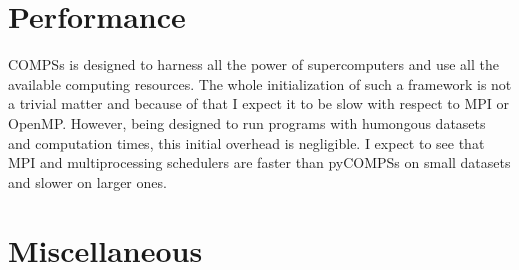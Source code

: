 \section{Performance}


COMPSs is designed to harness all the power of supercomputers and use all the available computing resources. The whole initialization of such a framework is not a trivial matter and because of that I expect it to be slow with respect to MPI or OpenMP. However, being designed to run programs with humongous datasets and computation times, this initial overhead is negligible. I expect to see that MPI and multiprocessing schedulers are faster than pyCOMPSs on small datasets and slower on larger ones. 





\section{Miscellaneous}